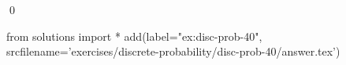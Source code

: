 
\begin{ex} 
  \label{ex:disc-prob-40}
  
  \qed
\end{ex} 
\begin{python0}
from solutions import *
add(label="ex:disc-prob-40",
    srcfilename='exercises/discrete-probability/disc-prob-40/answer.tex') 
\end{python0}
